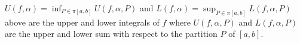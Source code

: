 \begin{remark}
    \( U(f,\alpha) = \inf_{P \in \pi [a,b]} U(f,\alpha, P) \) and \( L(f,\alpha) = \sup_{P \in \pi [a,b]} L(f, \alpha , P) \) above are the upper and lower integrals of \( f  \) where \( U(f,\alpha, P) \) and \( L(f,\alpha, P) \) are the upper and lower sum with respect to the partition \( P  \) of \( [a,b] \). 
\end{remark}
